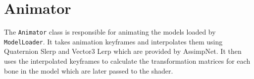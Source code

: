 \section{Animator}

The \texttt{Animator} class is responsible for animating the models loaded by \texttt{ModelLoader}.
It takes animation keyframes and interpolates them using Quaternion Slerp and Vector3 Lerp which are provided by AssimpNet.
It then uses the interpolated keyframes to calculate the transformation matrices for each bone in the model which are later passed to the shader.
